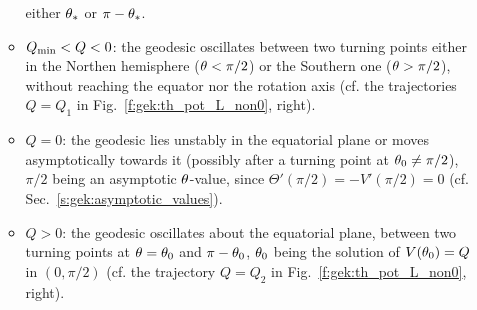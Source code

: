\begin{itemize}
\begin{itemize}
either $\theta_*$ or $\pi - \theta_*$.
\item $Q_{\rm min} < Q < 0$: the geodesic oscillates between two turning
points either in the Northen
hemisphere ($\theta < \pi/2$) or the Southern one ($\theta > \pi/2$), without reaching
the equator nor the rotation axis (cf. the trajectories $Q=Q_1$ in Fig.~\ref{f:gek:th_pot_L_non0}, right).
\item $Q=0$: the geodesic lies unstably in the equatorial plane or
moves asymptotically towards it (possibly after a turning point at $\theta_0\neq\pi/2$), $\pi/2$ being an asymptotic $\theta$-value, since $\Theta'(\pi/2) = - V'(\pi/2)=0$
(cf. Sec.~\ref{s:gek:asymptotic_values}).
\item $Q>0$: the geodesic oscillates about the equatorial plane,
between two turning points at $\theta=\theta_0$ and $\pi-\theta_0$, $\theta_0$ being the solution
of $V(\theta_0) = Q$ in $(0,\pi/2)$ (cf. the trajectory $Q=Q_2$ in Fig.~\ref{f:gek:th_pot_L_non0}, right).
\end{itemize}
\end{itemize}

